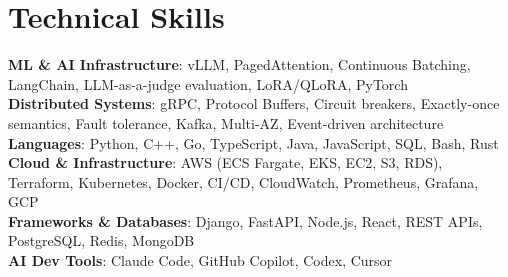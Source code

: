 \documentclass[letterpaper,11pt]{article}
\begin{document}
\section{Technical Skills}
\vspace{-7pt}
\begin{itemize}
[leftmargin=0.15in, label={}]\small{\item{
        \textbf{ML \& AI Infrastructure}{: vLLM, PagedAttention, Continuous Batching, LangChain, LLM-as-a-judge evaluation, LoRA/QLoRA, PyTorch} \\
        \textbf{Distributed Systems}{: gRPC, Protocol Buffers, Circuit breakers, Exactly-once semantics, Fault tolerance, Kafka, Multi-AZ, Event-driven architecture} \\
        \textbf{Languages}{: Python, C++, Go, TypeScript, Java, JavaScript, SQL, Bash, Rust} \\
        \textbf{Cloud \& Infrastructure}{: AWS (ECS Fargate, EKS, EC2, S3, RDS), Terraform, Kubernetes, Docker, CI/CD, CloudWatch, Prometheus, Grafana, GCP} \\
        \textbf{Frameworks \& Databases}{: Django, FastAPI, Node.js, React, REST APIs, PostgreSQL, Redis, MongoDB} \\
        \textbf{AI Dev Tools}{: Claude Code, GitHub Copilot, Codex, Cursor} \\
}}
\end{itemize}
\end{document}
